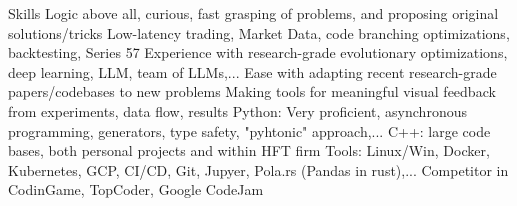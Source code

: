 \begin{rubric}{Skills}
\entry*[]%
Logic above all, curious, fast grasping of problems, and proposing original solutions/tricks 
\entry*[]%
Low-latency trading, Market Data, code branching optimizations, backtesting, Series 57
\entry*[]%
Experience with research-grade evolutionary optimizations, deep learning, LLM, team of LLMs,... 
\entry*[]%
Ease with adapting recent research-grade papers/codebases to new problems
\entry*[]%
Making tools for meaningful visual feedback from experiments, data flow, results
%
%
\entry*[]%
Python: Very proficient, asynchronous programming, generators, type safety, "pyhtonic" approach,...
\entry*[]%
C++: large code bases, both personal projects and within HFT firm
\entry*[]%
Tools: Linux/Win, Docker, Kubernetes, GCP, CI/CD, Git, Jupyer, Pola.rs (Pandas in rust),...
\entry*[]%
Competitor in CodinGame, TopCoder, Google CodeJam
%
%
\end{rubric}
